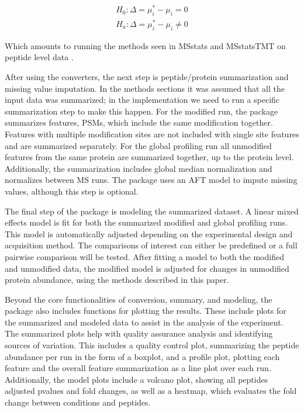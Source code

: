 \documentclass[mcp]{article}
\numberwithin{table}{section}
\begin{document}
\begin{equation}
\begin{aligned}
H_{0}: \Delta = \mu_{i}^{\ast} - \mu_{i} = 0 \\
H_{a}: \Delta = \mu_{i}^{\ast} - \mu_{i} \neq 0
\end{aligned}
\label{eq_9}
\end{equation}

Which amounts to running the methods seen in MSstats and MSstatsTMT on peptide level data \cite{Choi:2014} \cite{Huang:2020}.

After using the converters, the next step is peptide/protein summarization and missing value imputation. In the methods sections it was assumed that all the input data was summarized; in the implementation we need to run a specific summarization step to make this happen. For the modified run, the package summarizes features, PSMs, which include the same modification together. Features with multiple modification sites are not included with single site features and are summarized separately. For the global profiling run all unmodified features from the same protein are summarized together, up to the protein level. Additionally, the summarization includes global median normalization and normalizes between MS runs. The package uses an AFT model to impute missing values, although this step is optional.

The final step of the package is modeling the summarized dataset. A linear mixed effects model is fit for both the summarized modified and global profiling runs. This model is automatically adjusted depending on the experimental design and acquisition method. The comparisons of interest can either be predefined or a full pairwise comparison will be tested. After fitting a model to both the modified and unmodified data, the modified model is adjusted for changes in unmodified protein abundance, using the methods described in this paper. 

Beyond the core functionalities of conversion, summary, and modeling, the package also includes functions for plotting the results. These include plots for the summarized and modeled data to assist in the analysis of the experiment. The summarized plots help with quality assurance analysis and identifying sources of variation. This includes a quality control plot, summarizing the peptide abundance per run in the form of a boxplot, and a profile plot, plotting each feature and the overall feature summarization as a line plot over each run. Additionally, the model plots include a volcano plot, showing all peptides adjusted pvalues and fold changes, as well as a heatmap, which evaluates the fold change between conditions and peptides. 
\end{document}
